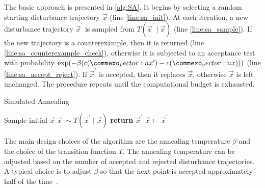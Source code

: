 The basic approach is presented in \cref{alg:SA}. It begins by selecting a random starting disturbance trajectory $\vec{x}$ (line \ref{line:sa_init}). At each iteration, a new disturbance trajectory $\vec{x}^\prime$ is sampled from $T(\vec{x}^\prime \mid \vec{x})$ (line \ref{line:sa_sample}). If the new trajectory is a counterexample, then it is returned (line \ref{line:sa_counterexample_check}), otherwise it is subjected to an acceptance test with probability ${\rm exp}(-\beta(c(\vec{x}^\prime) - c(\vec{x})))$ (line \ref{line:sa_accept_reject}). If $\vec{x}^\prime$ is accepted, then it replaces $\vec{x}$, otherwise $\vec{x}$ is left unchanged. The procedure repeats until the computational budget is exhausted.

\begin{algorithm}
\caption{Simulated Annealing} \label{alg:SA}
\begin{algorithmic}[1]
    \State Sample initial $\vec{x}$ \label{line:sa_init}
    \Loop
        \State $\vec{x}^\prime \sim T(\vec{x}^\prime \mid \vec{x})$ \label{line:sa_sample}
            \State \textbf{return} $\vec{x}^\prime$ \label{line:sa_counterexample_check}
        \EndIf
         \label{line:sa_accept_reject}
            \State $\vec{x} \gets \vec{x}^\prime$
        \EndIf
    \EndLoop
    \EndFunction
\end{algorithmic}
\end{algorithm}


The main design choices of the algorithm are the annealing temperature $\beta$ and the choice of the transition function $T$. The annealing temperature can be adjusted based on the number of accepted and rejected disturbance trajectories. A typical choice is to adjust $\beta$ so that the next point is accepted approximately half of the time~\cite{abbas2013probabilistic}. 

